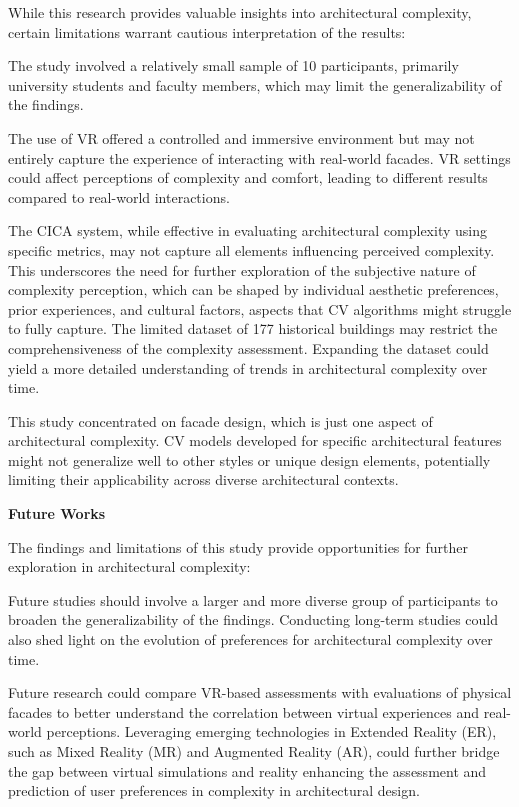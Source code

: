 While this research provides valuable insights into architectural complexity, certain limitations warrant cautious interpretation of the results:

The study involved a relatively small sample of 10 participants, primarily university students and faculty members, which may limit the generalizability of the findings.

The use of VR offered a controlled and immersive environment but may not entirely capture the experience of interacting with real-world facades.
VR settings could affect perceptions of complexity and comfort, leading to different results compared to real-world interactions.

The CICA system, while effective in evaluating architectural complexity using specific metrics, may not capture all elements influencing perceived complexity.
This underscores the need for further exploration of the subjective nature of complexity perception, which can be shaped by individual aesthetic preferences, prior experiences, and cultural factors, aspects that CV algorithms might struggle to fully capture.
The limited dataset of 177 historical buildings may restrict the comprehensiveness of the complexity assessment.
Expanding the dataset could yield a more detailed understanding of trends in architectural complexity over time.

This study concentrated on facade design, which is just one aspect of architectural complexity.
CV models developed for specific architectural features might not generalize well to other styles or unique design elements, potentially limiting their applicability across diverse architectural contexts.


\textbf{Future Works}

The findings and limitations of this study provide opportunities for further exploration in architectural complexity:

Future studies should involve a larger and more diverse group of participants to broaden the generalizability of the findings.
Conducting long-term studies could also shed light on the evolution of preferences for architectural complexity over time.

Future research could compare VR-based assessments with evaluations of physical facades to better understand the correlation between virtual experiences and real-world perceptions.
Leveraging emerging technologies in Extended Reality (ER), such as Mixed Reality (MR) and Augmented Reality (AR), could further bridge the gap between virtual simulations and reality enhancing the assessment and prediction of user preferences in complexity in architectural design.

